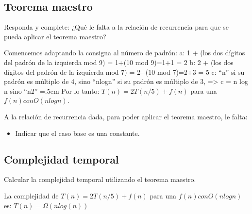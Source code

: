 \documentclass[titlepage,a4paper]{article}
\newenvironment{lcverbatim}
 {\SaveVerbatim{cverb}}
 {\endSaveVerbatim
  \flushleft\fboxrule=0pt\fboxsep=.5em
  \colorbox{cverbbg}{%
    \makebox[\dimexpr\linewidth-2\fboxsep][l]{\BUseVerbatim{cverb}}%
  }
  \endflushleft
}
\begin{document}
\newpage\subsection{Teorema maestro}
\begin{tcolorbox}[colback=blue!5!white,colframe=blue!75!black,title=Enunciado 2.1]
    Responda y complete: ¿Qué le falta a la relación de recurrencia para que se pueda aplicar el teorema maestro?
\end{tcolorbox}

Comencemos adaptando la consigna al número de padrón:
\begin{lcverbatim}
    a: 1 + (los dos dígitos del padrón de la izquierda mod 9) = 1+(10 mod 9)=1+1 = 2
    b: 2 + (los dos dígitos del padrón de la izquierda mod 7) = 2+(10 mod 7)=2+3 = 5
    c: “n” si su padrón es múltiplo de 4, 
       sino “nlogn” si su padrón es múltiplo de 3, => c = n log n
       sino “n2”
\end{lcverbatim}
Por lo tanto:
$T(n) = 2 T(n/5) + f(n)$ para una $f(n) con O(n log n)$.

A la relación de recurrencia dada, para poder aplicar el teorema maestro, le falta:
\begin{itemize}
    \item Indicar que el caso base es una constante.
\end{itemize}

\subsection{Complejidad temporal}
\begin{tcolorbox}[colback=blue!5!white,colframe=blue!75!black,title=Enunciado 2.2]
    Calcular la complejidad temporal utilizando el teorema maestro.
\end{tcolorbox}

La complejidad de $T(n) = 2 T(n/5) + f(n)$ para una $f(n) con O(n log n)$ es: $T(n)=\Omega(n log(n))$
\end{document}

